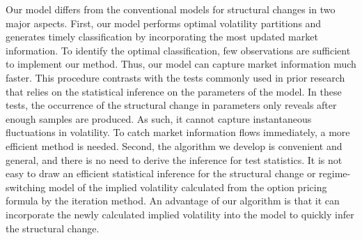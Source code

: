 \documentclass[preprint,12pt,authoryear]{elsarticle}
\begin{document}

Our model differs from the conventional models for structural changes in two major aspects.
First, our model performs optimal volatility partitions and generates timely classification by
incorporating the most updated market information.
To identify the optimal classification, few observations
are sufficient to implement our method.
Thus, our model can capture market information much faster. This procedure
contrasts with the tests commonly used in prior research that relies on the statistical inference on the
parameters of the model. In these tests, the occurrence of the structural change in parameters only reveals
after enough samples are produced. As such, it cannot capture instantaneous fluctuations in volatility.
To catch market information flows immediately, a more efficient method is needed. Second, the algorithm
we develop is convenient and general, and there is no need to derive the inference for test statistics.
It is not easy to draw an efficient statistical inference for the structural change or regime-switching
model of the implied volatility calculated from the option pricing formula by the iteration method.
An advantage of our algorithm is that it can incorporate the newly calculated implied volatility into the model 
to quickly infer the structural change.

\end{document}
